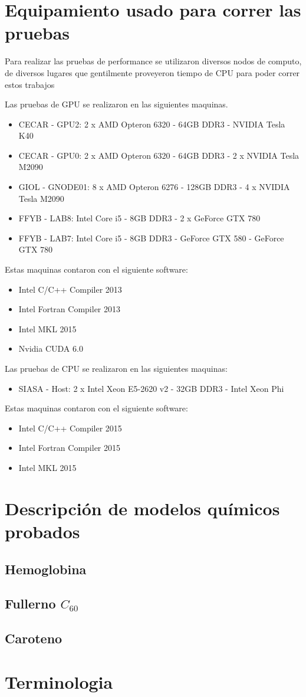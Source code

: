 \chapter{Equipamiento usado para correr las pruebas}

Para realizar las pruebas de performance se utilizaron diversos nodos de computo, de diversos lugares que
gentilmente proveyeron tiempo de CPU para poder correr estos trabajos

Las pruebas de GPU se realizaron en las siguientes maquinas.
\begin{itemize}
  \item CECAR - GPU2: 2 x AMD Opteron 6320 - 64GB DDR3 - NVIDIA Tesla K40
  \item CECAR - GPU0: 2 x AMD Opteron 6320 - 64GB DDR3 - 2 x NVIDIA Tesla M2090
  \item GIOL - GNODE01: 8 x AMD Opteron 6276 - 128GB DDR3 - 4 x NVIDIA Tesla M2090
  \item FFYB - LAB8: Intel Core i5 - 8GB DDR3 - 2 x GeForce GTX 780
  \item FFYB - LAB7: Intel Core i5 - 8GB DDR3 - GeForce GTX 580 - GeForce GTX 780
\end{itemize}

Estas maquinas contaron con el siguiente software:
\begin{itemize}
  \item Intel C/C++ Compiler 2013
  \item Intel Fortran Compiler 2013
  \item Intel MKL 2015
  \item Nvidia CUDA 6.0
\end{itemize}

Las pruebas de CPU se realizaron en las siguientes maquinas:
\begin{itemize}
  \item SIASA - Host: 2 x Intel Xeon E5-2620 v2 - 32GB DDR3 - Intel Xeon Phi
\end{itemize}

Estas maquinas contaron con el siguiente software:
\begin{itemize}
  \item Intel C/C++ Compiler 2015
  \item Intel Fortran Compiler 2015
  \item Intel MKL 2015
\end{itemize}

\chapter{Descripci\'on de modelos qu\'imicos probados}
\section*{Hemoglobina}
\section*{Fullerno $C_{60}$}
\section*{Caroteno}
\chapter{Terminologia}
